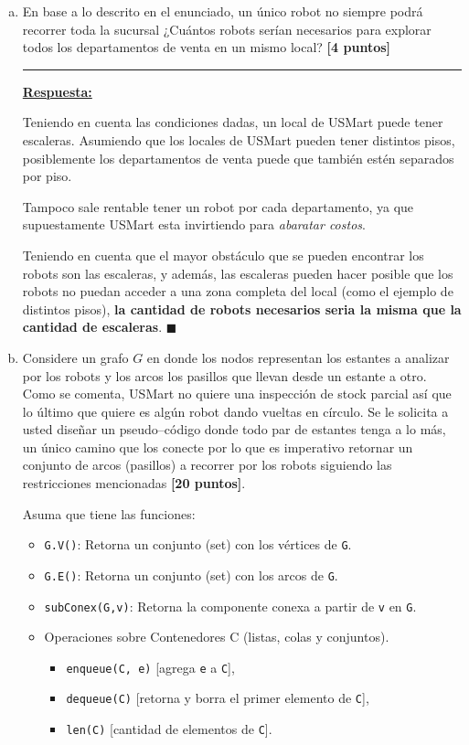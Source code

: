 \documentclass[letterpaper,10pt]{article}
\begin{document}
\begin{enumerate}[a)]
\item  En base a lo descrito en el enunciado, un único robot no siempre podrá recorrer toda la sucursal ¿Cuántos robots serían necesarios para explorar todos los departamentos de venta en un mismo local? \textbf{[4 puntos]}

\rule{5cm}{0.4pt}

\underline{\textbf{Respuesta:}}

Teniendo en cuenta las condiciones dadas, un local de USMart puede tener escaleras. Asumiendo que los locales de USMart pueden tener distintos pisos, posiblemente los departamentos de venta puede que también estén separados por piso.

Tampoco sale rentable tener un robot por cada departamento, ya que supuestamente USMart esta invirtiendo para \textit{abaratar costos}.

Teniendo en cuenta que el mayor obstáculo que se pueden encontrar los robots son las escaleras, y además, las escaleras pueden hacer posible que los robots no puedan acceder a una zona completa del local (como el ejemplo de distintos pisos), \textbf{la cantidad de robots necesarios seria la misma que la cantidad de escaleras}. \hfill \(\blacksquare\)


\newpage







\item Considere un grafo $G$ en donde los nodos representan los estantes a analizar por los robots y los arcos los pasillos que llevan desde un estante a otro. Como se comenta, USMart no quiere una inspección de stock parcial así que lo último que quiere es algún robot dando vueltas en círculo. Se le solicita a usted diseñar un pseudo--código donde todo par de estantes tenga a lo más, un único camino que los conecte por lo que es imperativo retornar un conjunto de arcos (pasillos) a recorrer por los robots siguiendo las restricciones mencionadas \textbf{[20 puntos]}.

Asuma que tiene las funciones:
\begin{itemize}
\item \texttt{G.V()}: Retorna un conjunto (set) con los vértices de \texttt{G}.
\item \texttt{G.E()}: Retorna un conjunto (set) con los arcos de \texttt{G}.
\item \texttt{subConex(G,v)}: Retorna la componente conexa a partir de \texttt{v} en \texttt{G}.
\item Operaciones sobre Contenedores C (listas, colas y conjuntos).
\begin{itemize}
\item \texttt{enqueue(C, e)} [agrega \texttt{e} a \texttt{C}],
\item \texttt{dequeue(C)} [retorna y borra el primer elemento de \texttt{C}],
\item \texttt{len(C)} [cantidad de elementos de \texttt{C}].
\end{itemize}
\end{itemize}


\end{enumerate}
\end{document}
